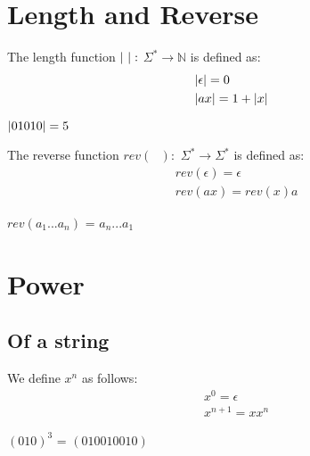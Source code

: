 \section{Length and Reverse} %
\label{sec:length_and_reverse}
\begin{Def}
    The {\color{red} length} function $\lvert\mbox{ }\rvert:$ $\Sigma^* \to \mathbb{N}$ is defined as:
    \begin{align*}
        &\lvert\epsilon\rvert = 0\\
        &\lvert ax\rvert = 1 + \lvert x\rvert
    \end{align*}
\end{Def}
\begin{Ex}
    $\lvert01010\rvert = 5$
\end{Ex}
\begin{Def}
    The {\color{red} reverse} function $rev(\mbox{ }):$ $\Sigma^* \to \Sigma^*$ is defined as:
    \begin{align*}
        &rev(\epsilon) = \epsilon\\
        &rev(ax) = rev(x)a
    \end{align*}
\end{Def}
\begin{Ex}
    $rev(a_1...a_n)$ = $a_n...a_1$
\end{Ex}

\section{Power} %
\label{sec:power}
\subsection{Of a string} %
\label{sub:of_a_string}
\begin{Def}
    We define $x^n$ as follows:
    \begin{align*}
        &x^0 = \epsilon\\
        &x^{n+1} = xx^n
    \end{align*}
\end{Def}
\begin{Ex}
    $(010)^3$ = $(010010010)$
\end{Ex}
